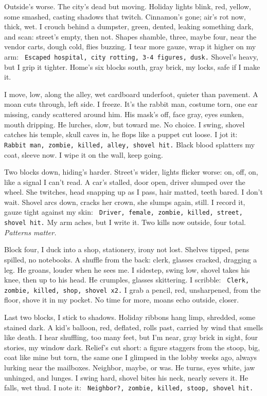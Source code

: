 \documentclass[12pt]{article}
\newcommand{\note}[1]{\texttt{\small \color{DarkGray} #1}}
\begin{document}
Outside’s worse. The city’s dead but moving. Holiday lights blink, red, yellow, some smashed, casting shadows that twitch. Cinnamon’s gone; air’s rot now, thick, wet. I crouch behind a dumpster, green, dented, leaking something dark, and scan: street’s empty, then not. Shapes shamble, three, maybe four, near the vendor carts, dough cold, flies buzzing. I tear more gauze, wrap it higher on my arm: \note{Escaped hospital, city rotting, 3-4 figures, dusk.} Shovel’s heavy, but I grip it tighter. Home’s six blocks south, gray brick, my locks, safe if I make it.

I move, low, along the alley, wet cardboard underfoot, quieter than pavement. A moan cuts through, left side. I freeze. It’s the rabbit man, costume torn, one ear missing, candy scattered around him. His mask’s off, face gray, eyes sunken, mouth dripping. He lurches, slow, but toward me. No choice. I swing, shovel catches his temple, skull caves in, he flops like a puppet cut loose. I jot it: \note{Rabbit man, zombie, killed, alley, shovel hit.} Black blood splatters my coat, sleeve now. I wipe it on the wall, keep going.

Two blocks down, hiding’s harder. Street’s wider, lights flicker worse: on, off, on, like a signal I can’t read. A car’s stalled, door open, driver slumped over the wheel. She twitches, head snapping up as I pass, hair matted, teeth bared. I don’t wait. Shovel arcs down, cracks her crown, she slumps again, still. I record it, gauze tight against my skin: \note{Driver, female, zombie, killed, street, shovel hit.} My arm aches, but I write it. Two kills now outside, four total. \textit{Patterns matter.}

Block four, I duck into a shop, stationery, irony not lost. Shelves tipped, pens spilled, no notebooks. A shuffle from the back: clerk, glasses cracked, dragging a leg. He groans, louder when he sees me. I sidestep, swing low, shovel takes his knee, then up to his head. He crumples, glasses skittering. I scribble: \note{Clerk, zombie, killed, shop, shovel x2.} I grab a pencil, red, unsharpened, from the floor, shove it in my pocket. No time for more, moans echo outside, closer.

Last two blocks, I stick to shadows. Holiday ribbons hang limp, shredded, some stained dark. A kid’s balloon, red, deflated, rolls past, carried by wind that smells like death. I hear shuffling, too many feet, but I’m near, gray brick in sight, four stories, my window dark. Relief’s cut short: a figure staggers from the stoop, big, coat like mine but torn, the same one I glimpsed in the lobby weeks ago, always lurking near the mailboxes. Neighbor, maybe, or was. He turns, eyes white, jaw unhinged, and lunges. I swing hard, shovel bites his neck, nearly severs it. He falls, wet thud. I note it: \note{Neighbor?, zombie, killed, stoop, shovel hit.}
\end{document}
